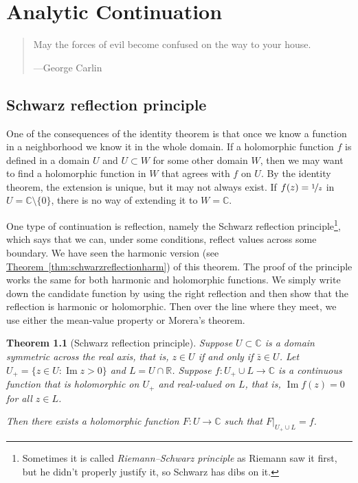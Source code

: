 \documentclass[12pt,openany]{book}
\renewcommand{\Im}{\operatorname{Im}}
\newcommand{\C}{{\mathbb{C}}}
\newcommand{\R}{{\mathbb{R}}}
\newcommand{\myindex}[1]{#1\index{#1}}
\theoremstyle{plain}
\newtheorem{thm}{Theorem}[section]
\theoremstyle{remark}
\theoremstyle{definition}
\newenvironment{myepigraph}{%
    \begin{quote}%
    \begingroup\itshape
}{%
    \endgroup%
    \end{quote}
}
\theoremstyle{exercise}
\theoremstyle{example}
\newcommand{\thmref}[1]{\hyperref[#1]{Theorem~\ref*{#1}}}
\begin{document}

\chapter{Analytic Continuation} \label{ch:analcont}

\begin{myepigraph}
May the forces of evil become confused on the way to your house.

---George Carlin
\end{myepigraph}


\section{Schwarz reflection principle}

One of the consequences of the identity theorem is that once we know a
function in a neighborhood we know it in the whole domain.
If a holomorphic function $f$ is defined in a
domain $U$ and $U \subset W$ for some other domain $W$,
then we may want to find a holomorphic function in $W$ that agrees with
$f$ on $U$.  By the identity theorem, the extension is unique, but it may not
always exist.  If $f(z) =
\nicefrac{1}{z}$ in $U = \C \setminus \{ 0 \}$, there is no way
of extending it to $W = \C$.

One type of continuation is reflection, namely the Schwarz reflection
principle\footnote{Sometimes it is called
\emph{\myindex{Riemann--Schwarz principle}} as Riemann saw it first, but he 
didn't properly justify it, so Schwarz has dibs on it.},
which 
says that we can, under some conditions, reflect values across some boundary.
We have seen the harmonic version (see \thmref{thm:schwarzreflectionharm})
of this theorem.
The proof of the principle works the same for both
harmonic and holomorphic functions.
We simply write down the candidate function by using
the right reflection and then show that the reflection is harmonic or
holomorphic.  Then over the line where they meet, we use either the
mean-value property or Morera's theorem.

\begin{thm}[Schwarz reflection principle]
\label{thm:schwarzreflectionholo}
Suppose $U \subset \C$ is a domain symmetric across the real axis, that is,
$z \in U$ if and only if $\bar{z} \in U$.
Let $U_+ = \{ z \in U : \Im z > 0 \}$ and $L = U \cap \R$.
Suppose $f \colon U_+ \cup L \to \C$ is a continuous function that is
holomorphic on $U_+$ and real-valued on $L$, that is,
$\Im f(z) = 0$ for all $z \in L$.

Then there exists a holomorphic function $F \colon U \to \C$ such that
$F|_{U_+ \cup L} = f$.
\end{thm}
\end{document}
